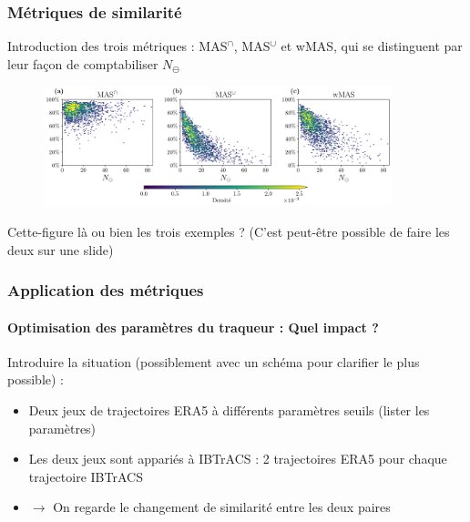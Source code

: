 \documentclass[aspectratio=169, usepdftitle=false, xcolor={dvipsnames}, 9pt,table]{beamer}
\begin{document}
\begin{frame}[c]
    \frametitle{Métriques de similarité}
    Introduction des trois métriques : MAS$^\cap$, MAS$^\cup$ et wMAS, qui se distinguent par leur façon de comptabiliser $N_\ominus$
    \vspace{2em}
    \begin{figure}
        \centering
        \includegraphics[width=0.9\textwidth]{Figures/MAS_vs_Ndiff.png}
    \end{figure}
    Cette-figure là ou bien les trois exemples ? (C'est peut-être possible de faire les deux sur une slide)
\end{frame}

\begin{frame}[c]
    \frametitle{Application des métriques}
    \framesubtitle{Optimisation des paramètres du traqueur : Quel impact ?}
    Introduire la situation (possiblement avec un schéma pour clarifier le plus possible) :
    \begin{itemize}
        \item Deux jeux de trajectoires ERA5 à différents paramètres seuils (lister les paramètres)
        \item Les deux jeux sont appariés à IBTrACS : 2 trajectoires ERA5 pour chaque trajectoire IBTrACS
        \item $\longrightarrow$ On regarde le changement de similarité entre les deux paires
    \end{itemize}
\end{frame}
\end{document}
